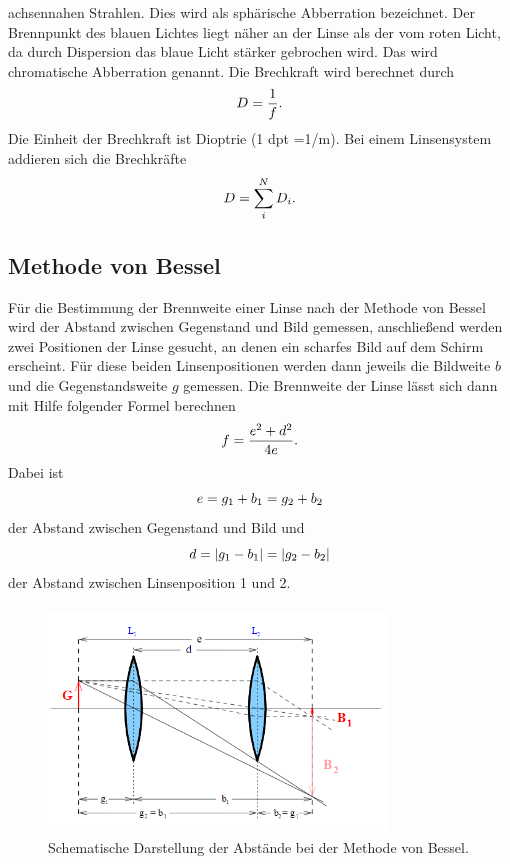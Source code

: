 achsennahen Strahlen. Dies wird als sphärische Abberration bezeichnet. Der Brennpunkt
des blauen Lichtes liegt näher an der Linse als der vom roten Licht, da durch Dispersion
das blaue Licht stärker gebrochen wird. Das wird chromatische Abberration genannt.
Die Brechkraft wird berechnet durch
\begin{equation}
    D=\frac{1}{f}.\\
   \end{equation}
\noindent
Die Einheit der Brechkraft ist Dioptrie (1 dpt =1/m). Bei einem Linsensystem addieren
sich die Brechkräfte
\begin{equation}
    D=\sum_{i}^{N} D_i .\\
   \end{equation}
\subsection{Methode von Bessel}
Für die Bestimmung der Brennweite einer Linse nach der Methode von Bessel wird der
Abstand zwischen Gegenstand und Bild gemessen, anschließend werden zwei Positionen
der Linse gesucht, an denen ein scharfes Bild auf dem Schirm erscheint. Für diese
beiden Linsenpositionen werden dann jeweils die Bildweite $b$ und die Gegenstandsweite $g$
gemessen. Die Brennweite der Linse lässt sich dann mit Hilfe folgender Formel berechnen
\begin{equation}
 f=\frac{e^2+d^2}{4e}.\\
   \end{equation}
\noindent
Dabei ist
\begin{equation}
   e=g_1+b_1=g_2+b_2\\
      \end{equation}
   \noindent
der Abstand zwischen Gegenstand und Bild und
\begin{equation}
   d=|g_1-b_1 |= |g_2-b_2 | \\
       \end{equation}
    \noindent
der Abstand zwischen Linsenposition 1 und 2.
\begin{figure}[H]
   \begin{center}
   \includegraphics[width = 9cm, height= 6cm]{Bessel.png}
   \caption{Schematische Darstellung der Abstände bei der Methode von Bessel.\protect\cite{AL}}
   \end{center}
   \label{fig:Bessel}
   \end{figure}
   \noindent
